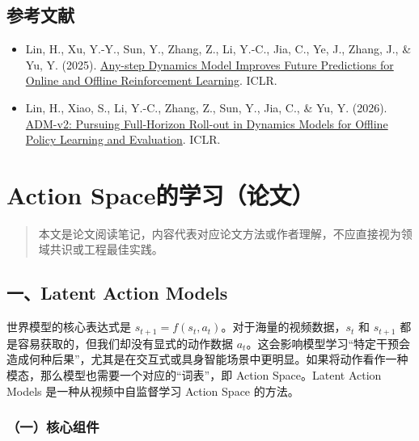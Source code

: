 \hypertarget{ux53c2ux8003ux6587ux732e-190}{%
\subsection{参考文献}\label{ux53c2ux8003ux6587ux732e-190}}

\begin{itemize}
\tightlist
\item
  Lin, H., Xu, Y.-Y., Sun, Y., Zhang, Z., Li, Y.-C., Jia, C., Ye, J., Zhang, J., \& Yu, Y. (2025). \href{https://openreview.net/forum?id=JZCxlrwjZ8}{Any-step Dynamics Model Improves Future Predictions for Online and Offline Reinforcement Learning}. ICLR.
\item
  Lin, H., Xiao, S., Li, Y.-C., Zhang, Z., Sun, Y., Jia, C., \& Yu, Y. (2026). \href{https://openreview.net/forum?id=ICbXEwqpga}{ADM-v2: Pursuing Full-Horizon Roll-out in Dynamics Models for Offline Policy Learning and Evaluation}. ICLR.
\end{itemize}

\clearpage

\hypertarget{action-spaceux7684ux5b66ux4e60ux8bbaux6587}{%
\section{Action Space的学习（论文）}\label{action-spaceux7684ux5b66ux4e60ux8bbaux6587}}

\begin{quote}
本文是论文阅读笔记，内容代表对应论文方法或作者理解，不应直接视为领域共识或工程最佳实践。
\end{quote}

\hypertarget{ux4e00latent-action-models}{%
\subsection{一、Latent Action Models}\label{ux4e00latent-action-models}}

世界模型的核心表达式是 \(s_{t+1}=f(s_t,a_t)\)。对于海量的视频数据，\(s_t\) 和 \(s_{t+1}\) 都是容易获取的，但我们却没有显式的动作数据 \(a_t\)。这会影响模型学习``特定干预会造成何种后果''，尤其是在交互式或具身智能场景中更明显。如果将动作看作一种模态，那么模型也需要一个对应的``词表''，即 Action Space。Latent Action Models 是一种从视频中自监督学习 Action Space 的方法。

\hypertarget{ux4e00ux6838ux5fc3ux7ec4ux4ef6}{%
\subsubsection{（一）核心组件}\label{ux4e00ux6838ux5fc3ux7ec4ux4ef6}}

